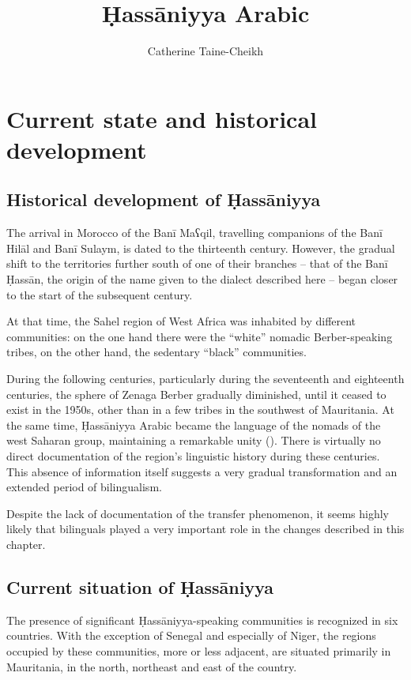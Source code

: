 \documentclass[output=paper]{langsci/langscibook}
\author{Catherine Taine-Cheikh\affiliation{CNRS, Lacito}}
\title{Ḥassāniyya Arabic}
\begin{document}
\maketitle 
 

\section{Current state and historical development}

\subsection{ Historical development of Ḥassāniyya} %

The arrival in Morocco of the Banī Maʕqil, travelling companions of the Banī Hilāl and Banī Sulaym, is dated to the thirteenth century. However, the gradual shift to the territories further south of one of their branches – that of the Banī Ḥassān, the origin of the name given to the dialect described here – began closer to the start of the subsequent century. 

At that time, the Sahel region of West Africa was inhabited by different communities: on the one hand there were the “white” nomadic Berber-speaking tribes, on the other hand, the sedentary “black” communities.

During the following centuries, particularly during the seventeenth and eighteenth centuries, the sphere of Zenaga Berber gradually diminished, until it ceased to exist in the 1950s, other than in a few tribes in the southwest of Mauritania. At the same time, Ḥassāniyya Arabic became the language of the nomads of the west Saharan group, maintaining a remarkable unity (\citealt{Taine-Cheikh2016,Taine-Cheikh2018historical}). There is virtually no direct documentation of the region’s linguistic history during these centuries. This absence of information itself suggests a very gradual transformation and an extended period of bilingualism.

Despite the lack of documentation of the transfer phenomenon, it seems highly likely that bilinguals played a very important role in the changes described in this chapter. 

\subsection{ Current situation of Ḥassāniyya} %

The presence of significant Ḥassāniyya-speaking communities is recognized in six countries. With the exception of Senegal and especially of Niger, the regions occupied by these communities, more or less adjacent, are situated primarily in Mauritania, in the north, northeast and east of the country. 
\end{document}
